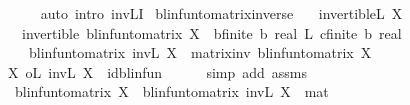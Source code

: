 \begin{isabellebody}
\ \ \ \ \isamarkupfalse%
\ {\isacharparenleft}{\kern0pt}auto\ intro{\isacharcolon}{\kern0pt}\ inv\isactrlsub L{\isacharunderscore}{\kern0pt}I{\isacharparenright}{\kern0pt}\isanewline
{}\isamarkupfalse%
%
\endisatagproof
{\isafoldproof}%
%
\isadelimproof
\isanewline
%
\endisadelimproof
\isanewline
\isanewline
{}\isamarkupfalse%
\ blinfun{\isacharunderscore}{\kern0pt}to{\isacharunderscore}{\kern0pt}matrix{\isacharunderscore}{\kern0pt}inverse{\isacharcolon}{\kern0pt}\isanewline
\ \ \ {\isachardoublequoteopen}invertible\isactrlsub L\ X{\isachardoublequoteclose}\isanewline
\ \ \ {\isachardoublequoteopen}invertible\ {\isacharparenleft}{\kern0pt}blinfun{\isacharunderscore}{\kern0pt}to{\isacharunderscore}{\kern0pt}matrix\ {\isacharparenleft}{\kern0pt}X\ {\isacharcolon}{\kern0pt}{\isacharcolon}{\kern0pt}\ {\isacharparenleft}{\kern0pt}{\isacharprime}{\kern0pt}b{\isacharcolon}{\kern0pt}{\isacharcolon}{\kern0pt}finite\ {\isasymRightarrow}\isactrlsub b\ real{\isacharparenright}{\kern0pt}\ {\isasymRightarrow}\isactrlsub L\ {\isacharprime}{\kern0pt}c{\isacharcolon}{\kern0pt}{\isacharcolon}{\kern0pt}finite\ {\isasymRightarrow}\isactrlsub b\ real{\isacharparenright}{\kern0pt}{\isacharparenright}{\kern0pt}{\isachardoublequoteclose}\ \isanewline
\ \ \ \ {\isachardoublequoteopen}blinfun{\isacharunderscore}{\kern0pt}to{\isacharunderscore}{\kern0pt}matrix\ {\isacharparenleft}{\kern0pt}inv\isactrlsub L\ X{\isacharparenright}{\kern0pt}\ {\isacharequal}{\kern0pt}\ matrix{\isacharunderscore}{\kern0pt}inv\ {\isacharparenleft}{\kern0pt}blinfun{\isacharunderscore}{\kern0pt}to{\isacharunderscore}{\kern0pt}matrix\ X{\isacharparenright}{\kern0pt}{\isachardoublequoteclose}\isanewline
%
\isadelimproof
%
\endisadelimproof
%
\isatagproof
{}\isamarkupfalse%
\ {\isacharminus}{\kern0pt}\isanewline
\ \ \isamarkupfalse%
\ {\isachardoublequoteopen}X\ o\isactrlsub L\ inv\isactrlsub L\ X\ {\isacharequal}{\kern0pt}\ id{\isacharunderscore}{\kern0pt}blinfun{\isachardoublequoteclose}\isanewline
\ \ \ \ \isamarkupfalse%
\ {\isacharparenleft}{\kern0pt}simp\ add{\isacharcolon}{\kern0pt}\ assms{\isacharparenright}{\kern0pt}\isanewline
\ \ \isamarkupfalse%
\ {}{\isacharcolon}{\kern0pt}\ {\isachardoublequoteopen}blinfun{\isacharunderscore}{\kern0pt}to{\isacharunderscore}{\kern0pt}matrix\ X\ {\isacharasterisk}{\kern0pt}{\isacharasterisk}{\kern0pt}\ blinfun{\isacharunderscore}{\kern0pt}to{\isacharunderscore}{\kern0pt}matrix\ {\isacharparenleft}{\kern0pt}inv\isactrlsub L\ X{\isacharparenright}{\kern0pt}\ {\isacharequal}{\kern0pt}\ mat\ {}{\isachardoublequoteclose}\isanewline

\end{isabellebody}
